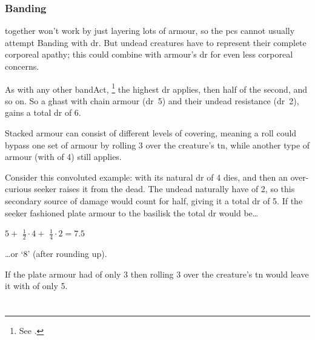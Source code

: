 \begin{multicols}{2}
\subsubsection{Banding }
\label{bandingArmour}
together won't work by just layering lots of armour, so the \glspl{pc} cannot usually attempt Banding with \gls{dr}.
But undead creatures have  to represent their complete corporeal apathy; this could combine with armour's \gls{dr} for even less corporeal concerns.

As with any other \gls{bandAct},%
\footnote{See .}
the highest \gls{dr} applies, then half of the second, and so on.
So a ghast with chain armour (\gls{dr}~5) and their undead resistance (\gls{dr}~2), gains a total \gls{dr} of 6.

Stacked armour can consist of different levels of \gls{covering}, meaning a roll could bypass one set of armour by rolling 3 over the creature's \gls{tn}, while another type of armour (with  of 4) still applies.

Consider this convoluted example:  with its natural \gls{dr} of 4 dies, and then an over-curious \gls{seeker} raises it from the dead.
The undead naturally have  of 2, so this secondary source of damage would count for half, giving it a total \gls{dr} of 5.
If the \gls{seeker} fashioned plate armour to the \gls{basilisk} the total \gls{dr} would be\ldots

\null
\begin{center}
{
  \LARGE $5 + $ \Large$\frac{1}{2}\cdot4 + $ \normalsize$\frac{1}{4}\cdot2 =  7.5$
}
\end{center}

\ldots or `8' (after rounding up).

If the plate armour had  of only 3 then rolling 3 over the creature's \gls{tn} would leave it with  of only 5.

\end{multicols}


\section{}

